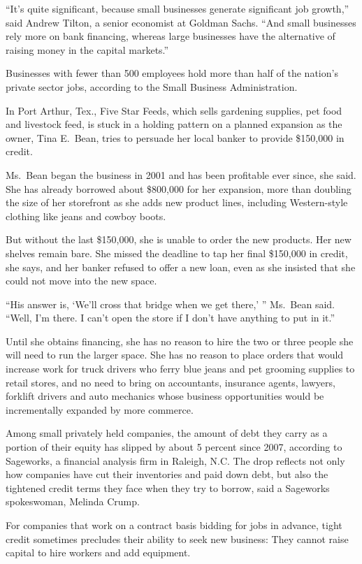 ﻿\documentclass[12pt]{article}
\begin{document}
``It's quite significant, because small businesses generate significant job growth,'' said Andrew
Tilton, a senior economist at Goldman Sachs. ``And small businesses rely more on bank financing,
whereas large businesses have the alternative of raising money in the capital markets.''

Businesses with fewer than 500 employees hold more than half of the nation's private sector jobs,
according to the Small Business Administration.

In Port Arthur, Tex., Five Star Feeds, which sells gardening supplies, pet food and livestock feed,
is stuck in a holding pattern on a planned expansion as the owner, Tina E.~Bean, tries to persuade
her local banker to provide \$150,000 in credit.

Ms.~Bean began the business in 2001 and has been profitable ever since, she said. She has already
borrowed about \$800,000 for her expansion, more than doubling the size of her storefront as she
adds new product lines, including Western-style clothing like jeans and cowboy boots.

But without the last \$150,000, she is unable to order the new products. Her new shelves remain
bare. She missed the deadline to tap her final \$150,000 in credit, she says, and her banker refused
to offer a new loan, even as she insisted that she could not move into the new space.

``His answer is, `We'll cross that bridge when we get there,' '' Ms.~Bean said. ``Well, I'm there. I
can't open the store if I don't have anything to put in it.''

Until she obtains financing, she has no reason to hire the two or three people she will need to run
the larger space. She has no reason to place orders that would increase work for truck drivers who
ferry blue jeans and pet grooming supplies to retail stores, and no need to bring on accountants,
insurance agents, lawyers, forklift drivers and auto mechanics whose business opportunities would be
incrementally expanded by more commerce.

Among small privately held companies, the amount of debt they carry as a portion of their equity has
slipped by about 5 percent since 2007, according to Sageworks, a financial analysis firm in Raleigh,
N.C. The drop reflects not only how companies have cut their inventories and paid down debt, but
also the tightened credit terms they face when they try to borrow, said a Sageworks spokeswoman,
Melinda Crump.

For companies that work on a contract basis bidding for jobs in advance, tight credit sometimes
precludes their ability to seek new business: They cannot raise capital to hire workers and add
equipment.
\end{document}
